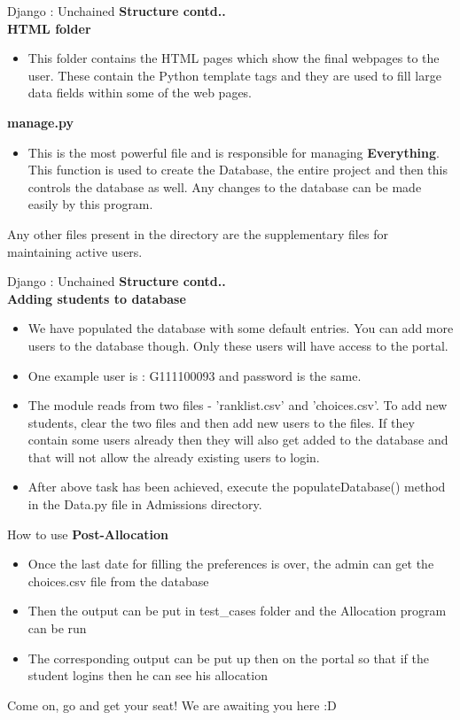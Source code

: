 \documentclass{beamer}
\begin{document}
\begin{frame}[t]{Django : Unchained}
\textbf{Structure contd..}\\
\textbf{HTML folder}
\begin{itemize}[<+->]
\item This folder contains the HTML pages which show the final webpages to the user. These contain the Python template tags and they are used to fill large data fields within some of the web pages.
\end{itemize}
\textbf{manage.py}
\begin{itemize}[<+->]
\item This is the most powerful file and is responsible for managing \textbf{Everything}. This function is used to create the Database, the entire project and then this controls the database as well. Any changes to the database can be made easily by this program.
\end{itemize}
Any other files present in the directory are the supplementary files for maintaining active users.
\end{frame}

\begin{frame}[t]{Django : Unchained}
\textbf{Structure contd..}\\
\textbf{Adding students to database}
\begin{itemize}[<+->]
\item We have populated the database with some default entries. You can add more users to the database though. Only these users will have access to the portal.
\item One example user is : G111100093 and password is the same.
\item The module reads from two files - 'ranklist.csv' and 'choices.csv'. To add new students, clear the two files and then add new users to the files. If they contain some users already then they will also get added to the database and that will not allow the already existing users to login.
\item After above task has been achieved, execute the populateDatabase() method in the Data.py file in Admissions directory.
\end{itemize}
\end{frame}

\begin{frame}[t]{How to use}
\textbf{Post-Allocation}\\
\begin{itemize}[<+->]
\item Once the last date for filling the preferences is over, the admin can get the choices.csv file from the database
\item Then the output can be put in test\_cases folder and the Allocation program can be run
\item The corresponding output can be put up then on the portal so that if the student logins then he can see his allocation
\end{itemize}
\pause
Come on, go and get your seat! We are awaiting you here :D
\end{frame}
\end{document}
